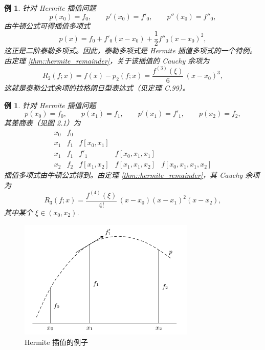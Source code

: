 \documentclass[a4paper]{ctexart}
\newtheorem{example}[theorem]{例}
\numberwithin{theorem}{section}
\numberwithin{equation}{section}
\numberwithin{figure}{section}
\numberwithin{remark}{section}
\begin{document}
\begin{example}
    \label{exp::hermite_taylor}
针对 Hermite 插值问题
\begin{equation*}
p(x_0)=f_0,\qquad p'(x_0)=f'_0,\qquad p''(x_0)=f''_0,
\end{equation*}
由牛顿公式可得插值多项式
\begin{equation*}
p(x)=f_0+f'_0(x-x_0)+\frac{1}{2}f''_0(x-x_0)^2,
\end{equation*}
这正是二阶泰勒多项式。因此，泰勒多项式是 Hermite 插值多项式的一个特例。
由定理 \ref{thm::hermite_remainder}，关于该插值的 Cauchy 余项为
\begin{equation*}
R_2(f;x)=f(x)-p_2(f;x)=\frac{f^{(3)}(\xi)}{6}\,(x-x_0)^3,
\end{equation*}
这就是泰勒公式余项的拉格朗日型表达式（见定理 C.99）。
\end{example}

\begin{example}
    \label{exp::hermite_example}
针对 Hermite 插值问题
\begin{equation*}
p(x_0)=f_0,\qquad p(x_1)=f_1,\qquad p'(x_1)=f'_1,\qquad p(x_2)=f_2,
\end{equation*}
其差商表（见图 2.1）为
\begin{equation*}
\begin{array}{c|cccc}
x_0 & f_0 & & & \\
x_1 & f_1 & f[x_0,x_1] & & \\
x_1 & f_1 & f'_1 & f[x_0,x_1,x_1] & \\
x_2 & f_2 & f[x_1,x_2] & f[x_1,x_1,x_2] & f[x_0,x_1,x_1,x_2]
\end{array}
\end{equation*}
插值多项式由牛顿公式得到。由定理 \ref{thm::hermite_remainder}，其 Cauchy 余项为
\begin{equation*}
R_3(f;x)=\frac{f^{(4)}(\xi)}{4!}\,(x-x_0)(x-x_1)^2(x-x_2),
\end{equation*}
其中某个 $\xi\in(x_0,x_2)$.
\end{example}

\begin{figure}
    \centering
    \includegraphics[width=0.75\textwidth]{images/hermite.png}
    \caption{Hermite 插值的例子}
    \label{fig::hermite_divided_difference}
\end{figure}
\end{document}
